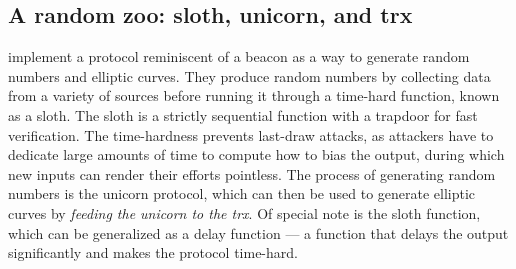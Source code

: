\subsection{A random zoo: sloth, unicorn, and trx}
\label{sub:random_zoo}
\citet{randomzoo} implement a protocol reminiscent of a beacon as a way to generate random numbers and elliptic curves.
They produce random numbers by collecting data from a variety of sources before running it through a time-hard function, known as a sloth.
The sloth is a strictly sequential function with a trapdoor for fast verification.
The time-hardness prevents last-draw attacks, as attackers have to dedicate large amounts of time to compute how to bias the output, during which new inputs can render their efforts pointless.
The process of generating random numbers is the unicorn protocol, which can then be used to generate elliptic curves by  \textit{feeding the unicorn to the trx}.
Of special note is the sloth function, which can be generalized as a delay function --- a function that delays the output significantly and makes the protocol time-hard.
